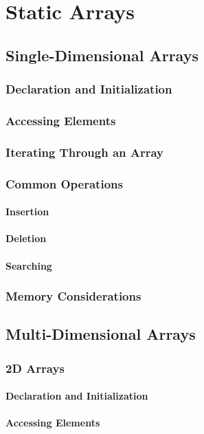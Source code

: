 \documentclass[12pt, oneside]{book}
\begin{document}
\chapter{Static Arrays}
	\section{Single-Dimensional Arrays}
	\subsection{Declaration and Initialization}
	\subsection{Accessing Elements}
	\subsection{Iterating Through an Array}
	\subsection{Common Operations}
	\subsubsection{Insertion}
	\subsubsection{Deletion}
	\subsubsection{Searching}
	\subsection{Memory Considerations}
	\section{Multi-Dimensional Arrays}
	\subsection{2D Arrays}
	\subsubsection{Declaration and Initialization}
	\subsubsection{Accessing Elements}
\end{document}
